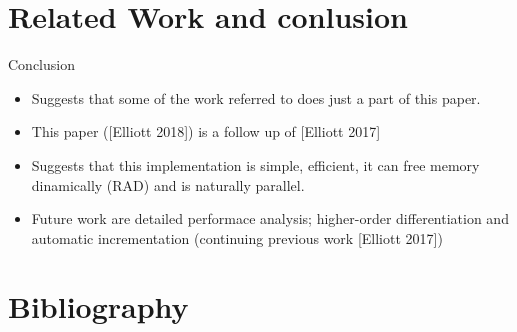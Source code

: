 \documentclass{beamer}
\theoremstyle{definition}
\theoremstyle{definition}
\theoremstyle{theorem}
\begin{document}
\section{Related Work and conlusion}
\begin{frame}{Conclusion}
\begin{itemize}
\item
    Suggests that some of the work referred to does just a part of this paper.
\item
    This paper ([Elliott 2018]\cite{Elliott:2018}) is a follow up of [Elliott 2017]\cite{Elliott:2017} 
\item
    Suggests that this implementation is simple, efficient, it can free memory dinamically (RAD) and is naturally parallel.
\item
    Future work are detailed performace analysis; higher-order differentiation and automatic incrementation (continuing previous work [Elliott 2017]\cite{Elliott:2017})
\end{itemize}
\end{frame}

\section{Bibliography}

\end{document}
